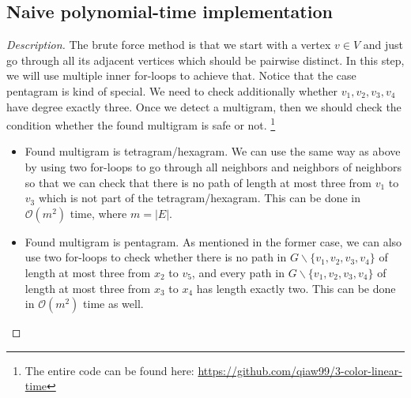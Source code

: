 \subsection{Naive polynomial-time implementation}
\begin{proof}[Description]
The brute force method is that we start with a vertex $v \in V$ and just go through all its adjacent vertices which should be pairwise distinct. In this step, we will use multiple inner for-loops to achieve that. Notice that the case pentagram is kind of special. We need to check additionally whether $v_1, v_2, v_3, v_4$ have degree exactly three. Once we detect a multigram, then we should check the condition whether the found multigram is safe or not. \footnote{ The entire code can be found here: \href{https://github.com/qiaw99/3-color-linear-time}{https://github.com/qiaw99/3-color-linear-time}}
\begin{itemize}
    \item Found multigram is tetragram/hexagram. We can use the same way as above by using two for-loops to go through all neighbors and neighbors of neighbors so that we can check that there is no path of length at most three from $v_1$ to $v_3$ which is not part of the tetragram/hexagram. This can be done in $\mathcal{O}(m^2)$ time, where $m = |E|$.
    
    \item Found multigram is pentagram. As mentioned in the former case, we can also use two for-loops to check whether there is no path in $G \backslash \{v_1, v_2, v_3, v_4\}$ of length at most three from $x_2$ to $v_5$, and every path in $G \backslash \{v_1, v_2, v_3, v_4\}$ of length at most three from $x_3$ to $x_4$ has length exactly two. This can be done in $\mathcal{O}(m^2)$ time as well.
\end{itemize}
\end{proof}

\newcommand\mycommfont[1]{\footnotesize\ttfamily\textcolor{blue}{#1}}


